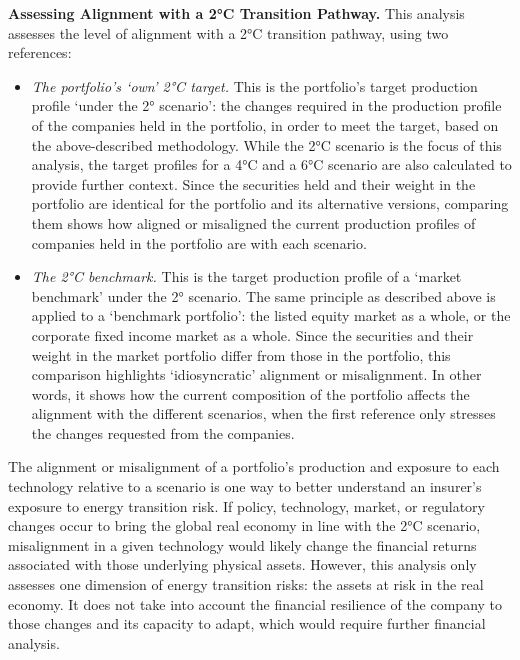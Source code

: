 \documentclass[10pt,table,a4]{article}\usepackage[]{graphicx}\usepackage[]{color}
\begin{document}
	\begin{multicols}{2}
		
		
		\textbf{Assessing Alignment with a 2°C Transition Pathway. }This analysis assesses the level of alignment with a 2°C transition pathway, using two references:
		
		\begin{itemize}
			\item{\textit{The portfolio's `own' 2°C target.} This is the portfolio's target production profile `under the 2° scenario': the changes required in the production profile of the companies held in the portfolio, in order to meet the target, based on the above-described methodology. While the 2°C scenario is the focus of this analysis, the target profiles for a 4°C and a 6°C scenario are also calculated to provide further context. Since the securities held and their weight in the portfolio are identical for the portfolio and its alternative versions, comparing them shows how aligned or misaligned the current production profiles of companies held in the portfolio are with each scenario.}
			
			\item{\textit{The 2°C benchmark. }This is the target production profile of a `market benchmark' under the 2° scenario. The same principle as described above is applied to a `benchmark portfolio': the listed equity market as a whole, or the corporate fixed income market as a whole. Since the securities and their weight in the market portfolio differ from those in the portfolio, this comparison highlights `idiosyncratic' alignment or misalignment. In other words, it shows how the current composition of the portfolio affects the alignment with the different scenarios, when the first reference only stresses the changes requested from the companies.}
		\end{itemize}
		
		
		The alignment or misalignment of a portfolio's production and exposure to each technology relative to a scenario is one way to better understand an insurer's exposure to energy transition risk. If policy, technology, market, or regulatory changes occur to bring the global real economy in line with the 2°C scenario, misalignment in a given technology would likely change the financial returns associated with those underlying physical assets. However, this analysis only assesses one dimension of energy transition risks: the assets at risk in the real economy. It does not take into account the financial resilience of the company to those changes and its capacity to adapt, which would require further financial analysis.
		

\end{multicols}
\end{document}

